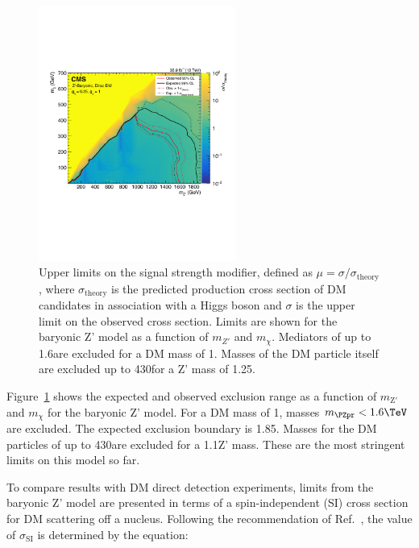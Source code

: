 \begin{figure}[htbp]
  \centering
  \includegraphics[width=0.575\textwidth]{figures/limits/limit2d_zpb_monohbb_.pdf}
  \caption{Upper limits on the signal strength modifier, defined as $\mu=\sigma/\sigma_\text{theory}$, where $\sigma_\text{theory}$ is the predicted production cross section of DM candidates in association with a Higgs boson and $\sigma$ is the upper limit on the observed cross section. Limits are shown for the baryonic Z' model  as a function of $m_{Z'}$ and $m_\chi$. Mediators of up to 1.6\TeV are excluded for a DM mass of 1\GeV. Masses of the DM particle itself are excluded up to 430\GeV for a Z' mass of 1.25\TeV.}
  \label{fig:limits}
\end{figure}




Figure~\ref{fig:limits} shows the expected and observed exclusion range as a function of $m_{\text{Z}'}$ and $m_{\chi}$ for the baryonic Z' model. For a DM mass of 1\GeV, masses $\mzp<1.6\TeV$ are excluded. The expected exclusion boundary is 1.85\TeV. Masses for the DM particles of up to 430\GeV are excluded for a 1.1\TeV Z' mass. These are the most stringent limits on this model so far. %

To compare results with DM direct detection experiments, limits from the baryonic Z' model are presented in terms of a spin-independent (SI) cross section \SigSI for DM scattering off a nucleus.
Following the recommendation of Ref.~\cite{presentDM}, the value of $\sigma_\text{SI}$ is determined by the equation:

